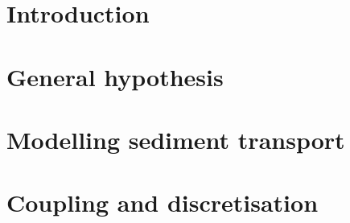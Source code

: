 \documentclass[Courlis]{../../data/TelemacDoc} %
\begin{document}

\printnomenclature

\chapter*{Introduction}\label{intro}

\newpage

\chapter{General hypothesis}\label{chap1}

\newpage

\chapter{Modelling sediment transport}\label{chap2}

\newpage

\chapter{Coupling and discretisation}\label{chap3}

\newpage

%
%
\end{document}
